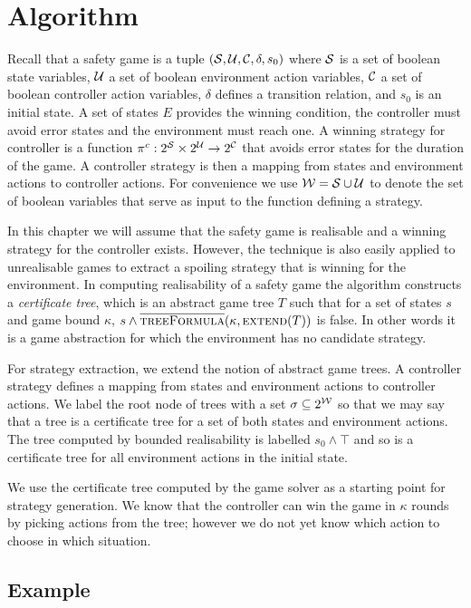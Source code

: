\section{Algorithm}

Recall that a safety game is a tuple $(\mathcal{S}, \mathcal{U}, \mathcal{C}, \delta, s_0)$ where $\mathcal{S}$ is a set of boolean state variables, $\mathcal{U}$ a set of boolean environment action variables, $\mathcal{C}$ a set of boolean controller action variables, $\delta$ defines a transition relation, and $s_0$ is an initial state. A set of states $E$ provides the winning condition, the controller must avoid error states and the environment must reach one. A winning strategy for controller is a function $\pi^c : 2^{\mathcal{S}} \times 2^{\mathcal{U}} \to 2^{\mathcal{C}}$ that avoids error states for the duration of the game. A controller strategy is then a mapping from states and environment actions to controller actions. For convenience we use $\mathcal{W} = \mathcal{S} \cup \mathcal{U}$ to denote the set of boolean variables that serve as input to the function defining a strategy.

In this chapter we will assume that the safety game is realisable and a winning strategy for the controller exists. However, the technique is also easily applied to unrealisable games to extract a spoiling strategy that is winning for the environment. In computing realisability of a safety game the algorithm constructs a \emph{certificate tree}, which is an abstract game tree $T$ such that for a set of states $s$ and game bound $\kappa$, $s \land \textsc{$\overline{\mbox{treeFormula}}$}(\kappa, \textsc{extend}(T))$ is false. In other words it is a game abstraction for which the environment has no candidate strategy.

For strategy extraction, we extend the notion of abstract game trees. A controller strategy defines a mapping from states and environment actions to controller actions. We label the root node of trees with a set $\sigma \subseteq 2^{\mathcal{W}}$ so that we may say that a tree is a certificate tree for a set of both states and environment actions. The tree computed by bounded realisability is labelled $s_0 \land \top$ and so is a certificate tree for all environment actions in the initial state.

We use the certificate tree computed by the game solver as a starting point for strategy generation.  We know that the controller can win the game in $\kappa$ rounds by picking actions from the tree; however we do not yet know which action to choose in which situation.


\subsection{Example}

